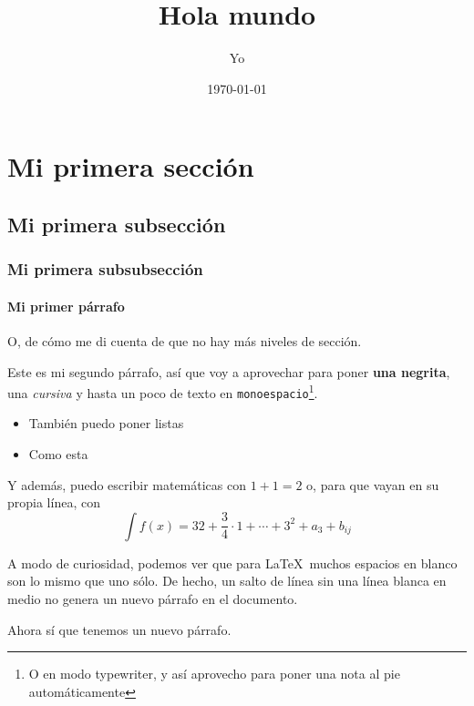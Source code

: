 \documentclass[a4paper]{article}
\title{Hola mundo}
\author{Yo}
\date{\today}
\begin{document}
\maketitle

\section{Mi primera sección}

\subsection{Mi primera subsección}

\subsubsection{Mi primera subsubsección}

\paragraph{Mi primer párrafo} O, de cómo me di cuenta de que no hay más niveles de sección.

Este es mi segundo párrafo, así que voy a aprovechar para poner \textbf{una negrita}, una \textit{cursiva} y hasta un poco de texto en \texttt{monoespacio}\footnote{O en modo typewriter, y así aprovecho para poner una nota al pie automáticamente}.

\begin{itemize}
	\item También puedo poner listas
	\item Como esta
\end{itemize}

Y además, puedo escribir matemáticas con $1 + 1 = 2$ o, para que vayan en su propia línea, con \[ \int f(x) = 32 + \frac{3}{4} \cdot 1 + \dotsb + 3^2 + a_3 + b_{ij} \]

A modo de curiosidad, podemos ver que para \LaTeX\            muchos espacios            en blanco son lo mismo que uno sólo.
De hecho,
un salto de línea
sin una línea blanca en medio no genera un nuevo párrafo en el documento.

Ahora sí que tenemos un nuevo párrafo.
\end{document}
